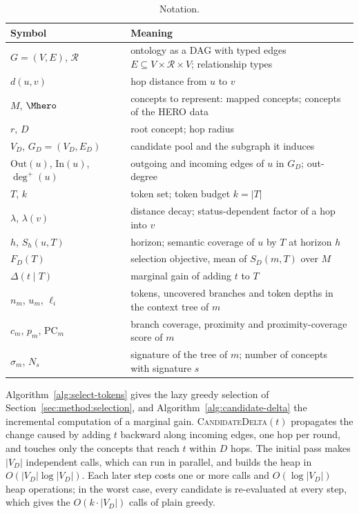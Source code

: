\begin{table}[h]
\centering
\small
\begin{tabular}{@{}ll@{}}
\toprule
\textbf{Symbol} & \textbf{Meaning} \\
\midrule
$G = (V, E)$, $\mathcal{R}$ & ontology as a DAG with typed edges $E \subseteq V \times \mathcal{R} \times V$; relationship types \\
$d(u, v)$ & hop distance from $u$ to $v$ \\
$M$, $\Mhero$ & concepts to represent: mapped concepts; concepts of the HERO data \\
$r$, $D$ & root concept; hop radius \\
$V_D$, $G_D = (V_D, E_D)$ & candidate pool and the subgraph it induces \\
$\mathrm{Out}(u)$, $\mathrm{In}(u)$, $\deg^+(u)$ & outgoing and incoming edges of $u$ in $G_D$; out-degree \\
$T$, $k$ & token set; token budget $k = |T|$ \\
$\lambda$, $\lambda(v)$ & distance decay; status-dependent factor of a hop into $v$ \\
$h$, $S_h(u, T)$ & horizon; semantic coverage of $u$ by $T$ at horizon $h$ \\
$F_D(T)$ & selection objective, mean of $S_D(m, T)$ over $M$ \\
$\Delta(t \mid T)$ & marginal gain of adding $t$ to $T$ \\
$n_m$, $u_m$, $\ell_i$ & tokens, uncovered branches and token depths in the context tree of $m$ \\
$c_m$, $p_m$, $\mathrm{PC}_m$ & branch coverage, proximity and proximity-coverage score of $m$ \\
$\sigma_m$, $N_s$ & signature of the tree of $m$; number of concepts with signature $s$ \\
\bottomrule
\end{tabular}
\caption{Notation.}
\label{tab:notation}
\end{table}

Algorithm~\ref{alg:select-tokens} gives the lazy greedy selection of Section~\ref{sec:method:selection}, and Algorithm~\ref{alg:candidate-delta} the incremental computation of a marginal gain.
\textsc{CandidateDelta}$(t)$ propagates the change caused by adding $t$ backward along incoming edges, one hop per round, and touches only the concepts that reach $t$ within $D$ hops.
The initial pass makes $|V_D|$ independent calls, which can run in parallel, and builds the heap in $O(|V_D| \log |V_D|)$.
Each later step costs one or more calls and $O(\log |V_D|)$ heap operations; in the worst case, every candidate is re-evaluated at every step, which gives the $O(k \cdot |V_D|)$ calls of plain greedy.

